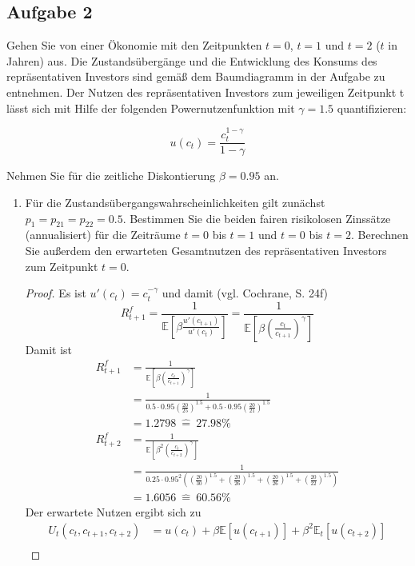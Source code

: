 \documentclass[12pt]{extreport} %
\theoremstyle{named}
\theoremstyle{nnamed}
\theoremstyle{itshape}
\theoremstyle{normal}
\begin{document}
\newpage

\subsection*{Aufgabe 2}
Gehen Sie von einer Ökonomie mit den Zeitpunkten $t = 0$, $t = 1$ und $t = 2$ ($t$ in Jahren) aus. Die Zustandsübergänge und die Entwicklung des Konsums des repräsentativen Investors sind gemäß dem Baumdiagramm in der Aufgabe zu entnehmen. Der Nutzen des repräsentativen Investors zum jeweiligen Zeitpunkt t lässt sich mit Hilfe der folgenden Powernutzenfunktion mit $\gamma = 1.5$ quantifizieren:

$$ u(c_t) = \frac{c_t^{1-\gamma}}{1 - \gamma} $$

Nehmen Sie für die zeitliche Diskontierung $\beta = 0.95$ an.
\begin{enumerate}
	\item Für die Zustandsübergangswahrscheinlichkeiten gilt zunächst $p_1 = p_{21} = p_{22} = 0.5$. Bestimmen Sie die beiden fairen risikolosen Zinssätze (annualisiert) für die Zeiträume $t = 0$ bis $t = 1$ und $t = 0$ bis $t = 2$. Berechnen Sie außerdem den erwarteten Gesamtnutzen des repräsentativen Investors zum Zeitpunkt $t = 0$.
	\begin{proof}
		Es ist $u'(c_t) = c_t^{-\gamma}$ und damit (vgl. Cochrane, S. 24f)
		$$ R_{t+1}^f = \frac{1}{\mathbb{E}\left[ \beta \frac{u'(c_{t+1})}{u'(c_t)} \right]} = \frac{1}{\mathbb{E}\left[ \beta \left( \frac{c_{t}}{c_{t+1}} \right)^\gamma \right]} $$
		Damit ist
		\begin{align*}
			R_{t+1}^f & = \frac{1}{\mathbb{E}\left[ \beta \left( \frac{c_{t}}{c_{t+1}} \right)^\gamma \right]} \\
			& =\frac{1}{0.5 \cdot 0.95  \left( \frac{20}{25} \right)^{1.5} + 0.5 \cdot 0.95  \left( \frac{20}{21} \right)^{1.5} } \\
			& = 1.2798 ~ \hat{=} ~ 27.98\% \\
			R_{t+2}^f & = \frac{1}{\mathbb{E}\left[ \beta^2 \left( \frac{c_{t}}{c_{t+2}} \right)^\gamma \right]} \\
			& =\frac{1}{0.25 \cdot 0.95^2 \left( \left( \frac{20}{30} \right)^{1.5} +  \left( \frac{20}{26} \right)^{1.5} + \left( \frac{20}{26} \right)^{1.5} + \left( \frac{20}{22} \right)^{1.5} \right)} \\
			& = 1.6056~ \hat{=} ~60.56\%
		\end{align*}
			Der erwartete Nutzen ergibt sich zu
			\begin{align*}
				U_t(c_t, c_{t+1}, c_{t+2}) & = u(c_t) + \beta \mathbb{E}[ u(c_{t+1})] + \beta^2 \mathbb{E}_t \left[ u(c_{t+2}) \right] \\

\end{align*}
\end{proof}
\end{enumerate}
\end{document}
